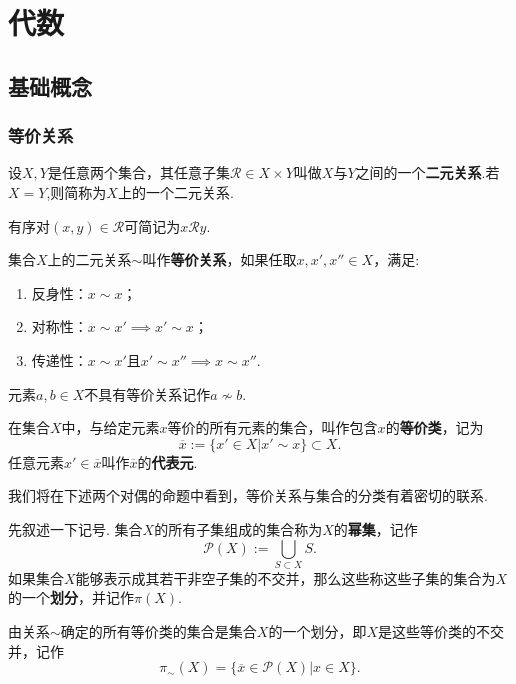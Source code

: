\documentclass[color=green,mathpazo,titlestyle=hang]{elegantbook}
\begin{document}
\chapter{代数}
\section{基础概念}

\subsection{等价关系}

\begin{newdef}[二元关系]
	设$X,Y$是任意两个集合，其任意子集$\mathcal{R}\in X\times Y$叫做$X$与$Y$之间的一个\textbf{二元关系}.若$X=Y$,则简称为$X$上的一个二元关系.	
\end{newdef}
有序对$(x,y)\in\mathcal{R}$可简记为$x\mathcal{R} y$.

\begin{newdef}[等价关系]
	集合$X$上的二元关系$\sim$叫作\textbf{等价关系}，如果任取$x,x',x''\in X$，满足:
	\begin{enumerate}
		\item 反身性：$x\sim x$；
		\item 对称性：$x\sim x'\implies x'\sim x$；
		\item 传递性：$x\sim x'$且$x'\sim x''\implies x\sim x''$.
	\end{enumerate}
\end{newdef}


元素$a,b\in X$不具有等价关系记作$a\not\sim b$.

\begin{newdef}[等价类]
	在集合$X$中，与给定元素$x$等价的所有元素的集合，叫作包含$x$的\textbf{等价类}，记为
	\[\overline{x}:=\{x'\in X|x'\sim x\}\subset X.\]
	任意元素$x'\in\overline{x}$叫作$\overline{x}$的\textbf{代表元}.
\end{newdef}


我们将在下述两个对偶的命题中看到，等价关系与集合的分类有着密切的联系.

先叙述一下记号. 集合$X$的所有子集组成的集合称为$X$的\textbf{幂集}，记作
\[\mathcal{P}(X):=\bigcup_{S\subset X} S.\]
如果集合$X$能够表示成其若干非空子集的不交并，那么这些称这些子集的集合为$X$的一个\textbf{划分}，并记作$\pi(X)$.


\begin{newprop}
	由关系$\sim$确定的所有等价类的集合是集合$X$的一个划分，即$X$是这些等价类的不交并，记作
	\[\pi_{\sim}(X)=\{\overline{x}\in \mathcal{P}(X)|x\in X\}.\]
\end{newprop}
\end{document}
